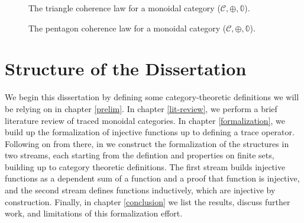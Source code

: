 \begin{figure}[h]
  \centering
  \caption{The triangle coherence law for a monoidal category (\(\mathcal{C}, \oplus, 𝟘\)).} \cite{awodey2010-category-theory-book,egbert1998-coherence-theorem}
  \label{fig:monoidal-triangle}
\end{figure}

\begin{figure}[h]
  \centering
  \caption{The pentagon coherence law for a monoidal category (\(\mathcal{C}, \oplus, 𝟘\)). \cite{awodey2010-category-theory-book,egbert1998-coherence-theorem}}
  \label{fig:monoidal-pentagon}
\end{figure}

\section{Structure of the Dissertation}

We begin this dissertation by defining some category-theoretic
definitions we will be relying on in chapter \ref{prelim}. In chapter \ref{lit-review},
we perform a brief literature review of traced monoidal categories. In
chapter \ref{formalization}, we build up the formalization of
injective functions up to defining a trace operator. 
Following on from there, in  we construct the formalization of the
structures in two streams, each starting from the defintion and
properties on finite sets, building up to category theoretic
definitions. The first stream builds injective functions as a
dependent sum of a function and a proof that function is injective,
and the second stream defines functions inductively, which are
injective by construction. Finally, in chapter \ref{conclusion} we
list the results, discuss further work, and limitations of this
formalization effort.


